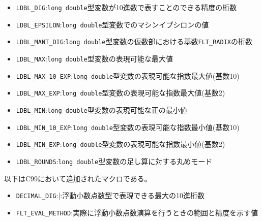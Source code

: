 \begin{itemize}
\item \verb|LDBL_DIG|:\verb|long double|型変数が10進数で表すことのできる精度の桁数
\item \verb|LDBL_EPSILON|:\verb|long double|型変数でのマシンイプシロンの値
\item \verb|LDBL_MANT_DIG|:\verb|long double|型変数の仮数部における基数\verb|FLT_RADIX|の桁数
\item \verb|LDBL_MAX|:\verb|long double|型変数の表現可能な最大値
\item \verb|LDBL_MAX_10_EXP|:\verb|long double|型変数の表現可能な指数最大値(基数10)
\item \verb|LDBL_MAX_EXP|:\verb|long double|型変数の表現可能な指数最大値(基数2)
\item \verb|LDBL_MIN|:\verb|long double|型変数の表現可能な正の最小値
\item \verb|LDBL_MIN_10_EXP|:\verb|long double|型変数の表現可能な指数最小値(基数10)
\item \verb|LDBL_MIN_EXP|:\verb|long double|型変数の表現可能な指数最小値(基数2)
\item \verb|LDBL_ROUNDS|:\verb|long double|型変数の足し算に対する丸めモード
\end{itemize}
以下はC99において追加されたマクロである。
\begin{itemize}
\item \verb|DECIMAL_DIG|:|:浮動小数点数型で表現できる最大の10進桁数
\item \verb|FLT_EVAL_METHOD|:実際に浮動小数点数演算を行うときの範囲と精度を示す値
\end{itemize}

